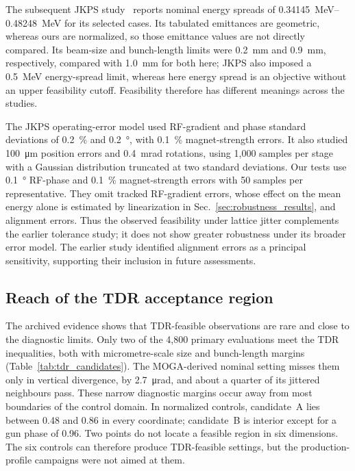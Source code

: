 \documentclass[aps,prab,reprint,superscriptaddress,amsmath,amssymb,floatfix]{revtex4-2}
\begin{document}
The subsequent JKPS study~\cite{Kim2025KLSError} reports nominal energy spreads of
\SIrange{0.34145}{0.48248}{\mega\electronvolt} for its selected cases. Its tabulated emittances are
geometric, whereas
ours are normalized, so those emittance values are not directly compared. Its beam-size and
bunch-length limits were \SI{0.2}{\milli\metre} and \SI{0.9}{\milli\metre}, respectively, compared
with \SI{1.0}{\milli\metre} for both here;
JKPS also imposed a \SI{0.5}{\mega\electronvolt} energy-spread limit, whereas here energy spread is
an objective
without an upper feasibility cutoff. Feasibility therefore has different meanings across the studies.

The JKPS operating-error model used RF-gradient and phase standard deviations of \SI{0.2}{\percent} and
\SI{0.2}{\degree}, with \SI{0.1}{\percent} magnet-strength errors. It also studied \SI{100}{\micro\metre}
position errors and \SI{0.4}{\milli\radian} rotations, using 1,000 samples per stage with a Gaussian
distribution
truncated at two standard deviations. Our tests use \SI{0.1}{\degree} RF-phase and
\SI{0.1}{\percent} magnet-strength
errors with 50 samples per representative. They omit tracked RF-gradient errors, whose effect on the
mean energy alone is estimated by linearization in Sec.~\ref{sec:robustness_results}, and
alignment errors. Thus the
observed feasibility under lattice jitter complements the earlier tolerance study; it does not
show greater robustness under its broader error model. The earlier study identified alignment
errors as a principal sensitivity, supporting their inclusion in future assessments.

\subsection{Reach of the TDR acceptance region}
\label{sec:tdr_reach}
The archived evidence shows that TDR-feasible observations are rare and close to the diagnostic
limits. Only two of the 4,800 primary evaluations meet the TDR inequalities, both with
micrometre-scale size and bunch-length margins (Table~\ref{tab:tdr_candidates}). The
MOGA-derived nominal setting misses them only in vertical divergence, by
\SI{2.7}{\micro\radian}, and about a quarter of its jittered neighbours pass. These narrow
diagnostic margins occur away from most boundaries of the control domain. In
normalized controls, candidate~A lies between 0.48 and 0.86 in every coordinate; candidate~B is
interior except for a gun phase of 0.96. Two points do not locate a feasible region in six dimensions. The
six controls can therefore produce TDR-feasible settings, but the production-profile campaigns
were not aimed at them.
\end{document}

